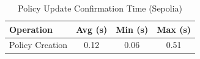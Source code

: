 \begin{table}[ht]
\centering
\caption{Policy Update Confirmation Time (Sepolia)}
\small
\begin{tabular}{lccc}
\toprule
\textbf{Operation} & \textbf{Avg (s)} & \textbf{Min (s)} & \textbf{Max (s)} \\
\midrule
Policy Creation & 0.12 & 0.06 & 0.51 \\
\bottomrule
\end{tabular}
\label{tab:e2-policy}
\end{table}
